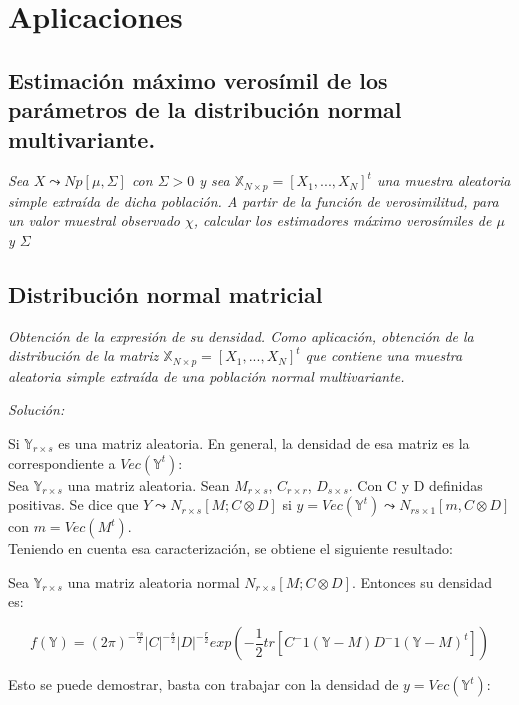 \documentclass{article}
\theoremstyle{theorem-style}  %
\theoremstyle{definition-style}
\theoremstyle{example-style}
\theoremstyle{exercise-style}
\begin{document}
	\section{Aplicaciones}
	
	\subsection{Estimación máximo verosímil de los parámetros de la distribución normal multivariante.}
	
	\textit{Sea $X \leadsto Np[\mu, \Sigma]$ con $\Sigma > 0$ y sea $\mathbb{X}_{N \times p} = [X_1, ..., X_N]^t$ una muestra aleatoria simple extraída de dicha población. A partir de la función de verosimilitud, para un valor muestral observado $\chi$, calcular los estimadores máximo verosímiles de $\mu$ y $\Sigma$}
	
	\subsection{Distribución normal matricial}
	
	\textit{Obtención de la expresión de su densidad. Como aplicación, obtención de la distribución de la matriz $\mathbb{X}_{N \times p} = [X_1, ..., X_N]^t$ que contiene una muestra aleatoria simple extraída de una población normal multivariante.}
	
	\textit{Solución:}
	
	Si $\mathbb{Y}_{r\times s}$ es una matriz aleatoria. En general, la densidad de esa matriz es la correspondiente a $Vec(\mathbb{Y}^t)$: \\
	
	Sea $\mathbb{Y}_{r\times s}$ una matriz aleatoria. Sean $M_{r\times s}$, $C_{r\times r}$, $D_{s\times s}$. Con C y D definidas positivas. Se dice que $Y \leadsto N_{r \times s}[M;C\otimes D]$ si $y= Vec(\mathbb{Y}^t) \leadsto N_{rs\times 1}[m, C \otimes D]$ con $m=Vec(M^t)$. \\
	
	Teniendo en cuenta esa caracterización, se obtiene el siguiente resultado:
	
	Sea $\mathbb{Y}_{r\times s}$ una matriz aleatoria normal $N_{r\times s}[M; C \otimes D]$. Entonces su densidad es:
	
	$$f(\mathbb{Y}) = (2\pi)^{-\frac{rs}{2}}|C|^{-\frac{s}{2}}|D|^{-\frac{r}{2}}exp(-\frac{1}{2}tr[C^-1(\mathbb{Y}-M)D^-1(\mathbb{Y}-M)^t])$$
	
	Esto se puede demostrar, basta con trabajar con la densidad de $y=Vec(\mathbb{Y}^t)$:
	
\end{document}
